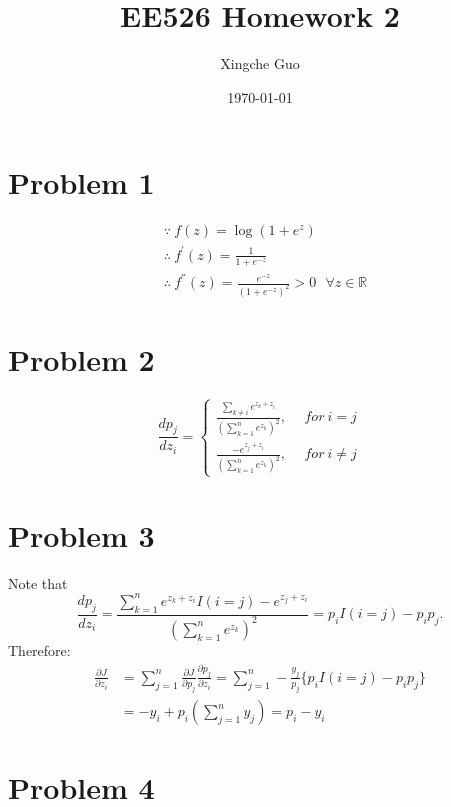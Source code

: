 \documentclass[12pt]{article}
\title{EE526 Homework 2}
\author{Xingche Guo}
\date{\today}
\begin{document}
\maketitle

\section*{Problem 1}

\begin{align*}
& \because \ f(z) = \log (1 + e^z) \\
& \therefore \ f^{'}(z) = \frac{1}{1 + e^{-z}} \\
& \therefore \ f^{''}(z) = \frac{e^{-z}}{(1+e^{-z})^2} > 0 \ \ \ \forall z \in \mathbb{R}
\end{align*}


\section*{Problem 2}

\begin{equation*}
\frac{d p_j}{d z_i} = 
\left\{  
\begin{aligned}
\frac{ \sum_{k \neq i} e^{z_k  + z_i}  }{(\sum_{k=1}^n e^{z_k})^2 }, & \ \ for \ i=j \\
\frac{  - e^{z_j  + z_i}  }{(\sum_{k=1}^n e^{z_k})^2 }, & \ \ for \ i \neq j
\end{aligned}
\right.
\end{equation*}


\section*{Problem 3}

Note that
$$
\frac{d p_j}{d z_i} = \frac{ \sum_{k=1}^n e^{z_k  + z_i} I(i=j)  - e^{z_j  + z_i}  }{(\sum_{k=1}^n e^{z_k})^2 } = p_i I(i=j) - p_i p_j.
$$
Therefore:
\begin{align*}
\frac{\partial J}{ \partial z_i} & = \sum_{j=1}^n \frac{\partial J}{ \partial p_j} \frac{\partial p_j}{ \partial z_i}  =
\sum_{j=1}^n -\frac{y_j}{p_j} \bigg\{p_i I(i=j) - p_i p_j \bigg\} \\
& =  -y_i + p_i (\sum_{j=1}^n y_j) = p_i - y_i
\end{align*}


\section*{Problem 4}
\end{document}
